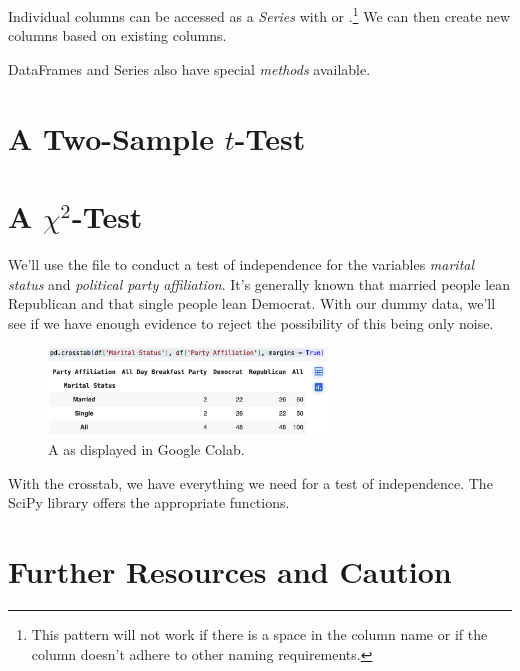 \documentclass{article}
\begin{document}

Individual columns can be accessed as a \emph{Series} with  or .\footnote{This pattern will not work if there is a space in the column name or if the column doesn't adhere to other naming requirements.} We can then create new columns based on existing columns. 


\noindent DataFrames and Series also have special \emph{methods} available. 



\section{A Two-Sample $t$-Test}


\section{A $\chi^2$-Test}

We'll use the  file to conduct a test of independence for the variables \emph{marital status} and \emph{political party affiliation}. It's generally known that married people lean Republican and that single people lean Democrat. With our dummy data, we'll see if we have enough evidence to reject the possibility of this being only noise. 


\begin{figure}[h!]
\centering
\includegraphics[width=0.66\textwidth]{figures/pd-crosstab}
\caption{A  as displayed in Google Colab.}
\label{fig:your_label}
\end{figure}

With the crosstab, we have everything we need for a test of independence. The SciPy library offers the appropriate functions. 


\section{Further Resources and Caution}
\end{document}
